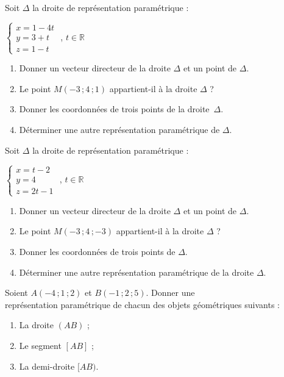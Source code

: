 \begin{colonne*exercice}
\begin{exercice}\label{ex49G2}
  Soit $\Delta$ la droite de représentation paramétrique :
{\centering
  $\begin{cases}x=1-4t \\y=3+t \\z=1-t \end{cases}$ , $t\in\mathbb{R}$
\par\vspace{-.5\baselineskip}}
\begin{enumerate}
\item Donner un vecteur directeur de la droite $\Delta$ et un point de
  $\Delta$.
\item Le point $M(-3\,;4\,;1)$ appartient-il à la droite $\Delta$ ?
\item Donner les coordonnées de trois points de la droite~$\Delta$.
\item Déterminer une autre représentation paramétrique de $\Delta$.
\end{enumerate}
\end{exercice}

\begin{exercice}
  Soit  $\Delta$ la droite de représentation paramétrique :

  \begin{center}
    $\begin{cases}x=t-2 \\y=4 \\z=2t-1 \end{cases}$ , $t\in\mathbb{R}$
  \end{center}

  \begin{enumerate}
  \item Donner un vecteur directeur de la droite $\Delta$ et un point
    de $\Delta$.
  \item Le point $M(-3\,;4\,;-3)$ appartient-il à la droite $\Delta$ ?
  \item Donner les coordonnées de trois points de $\Delta$.
  \item Déterminer une autre représentation paramétrique de la droite
    $\Delta$.
  \end{enumerate}
\end{exercice}

\begin{exercice}
  Soient $A(-4\,;1\,;2)$ et $B(-1\,;2\,;5)$. Donner une\\
  représentation paramétrique de chacun des objets géométriques
  suivants :
  \begin{enumerate}
  \item La droite $(AB)$ ;
  \item Le segment $[AB]$ ;
  \item La demi-droite $[AB)$.
  \end{enumerate}
\end{exercice}


\end{colonne*exercice}
